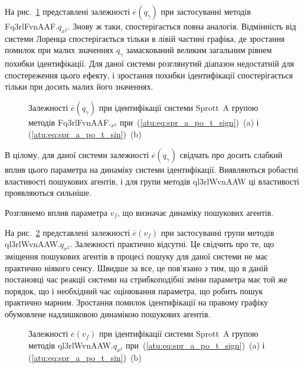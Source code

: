 На рис.~\ref{atu:f:spr_a_qg_Fq3rlFvnAAF_q_x2} представлені залежності
$\overline{e} (q_\gamma)$ при застосуванні методів Fq3rlFvnAAF.$q_{x^2}$.
Знову ж таки, спостерігається повна
аналогія. Відмінність від системи Лоренца спостерігається
тільки в лівій частині графіка, де зростання помилок при малих
значеннях
$q_\gamma$ замаскований великим загальним рівнем похибки
ідентифікації. Для даної системи розглянутий діапазон
недостатній для спостереження цього ефекту, і зростання похибки
ідентифікації спостерігається тільки при досить малих його
значеннях.

\begin{figure}[htb!]
  \caption{Залежності $\overline{e} (q_\gamma)$ при ідентифікації системи Sprott~A групою методів Fq3rlFvnAAF.$_{x^2}$ при~(\ref{atu:eq:spr_a_po_t_sign})~(a) і (\ref{atu:eq:spr_a_po_t_sin})~(b)}
  \label{atu:f:spr_a_qg_Fq3rlFvnAAF_q_x2}
\end{figure}

В цілому, для даної системи залежності
$\overline{e}(q_\gamma)$ свідчать про досить слабкий вплив цього
параметра на динаміку системи ідентифікації. Виявляються
робастні властивості пошукових агентів, і для групи методів
ql3rlWvnAAW ці властивості проявляються сильніше.


Розглянемо вплив параметра
$v_f$, що визначає динаміку пошукових агентів.

На рис.~\ref{atu:f:spr_a_v_f_ql3rlWvnAAW_q_x2} представлені залежності
$\overline{e} (v_f)$ при застосуванні групи методів ql3rlWvnAAW.$q_{x^2}$.
Залежності практично відсутні. Це свідчить про те, що зміщення
пошукових агентів в процесі пошуку для даної системи не має
практично ніякого сенсу. Швидше за все, це пов'язано з тим, що в
даній постановці час реакції системи на стрибкоподібні зміни
параметра має той же порядок, що і необхідний час оцінювання
параметра, що робить пошук практично марним. Зростання помилок
ідентифікації на правому графіку обумовлене надлишковою
динамікою пошукових агентів.



\begin{figure}[htb!]
  \caption{Залежності $\overline{e}(v_f)$ при ідентифікації системи Sprott~A групою методів ql3rlWvnAAW.$q_{x^2}$ при~(\ref{atu:eq:spr_a_po_t_sign})~(a) і (\ref{atu:eq:spr_a_po_t_sin})~(b)}
  \label{atu:f:spr_a_v_f_ql3rlWvnAAW_q_x2}
\end{figure}

